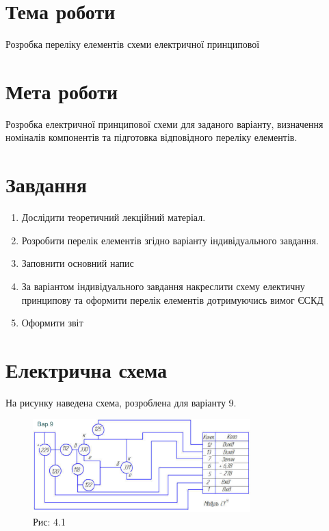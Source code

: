 \documentclass[a4paper]{article}
\begin{document}
\section*{Тема роботи}
Розробка
переліку елементів схеми електричної принципової

\section*{Мета роботи}
Розробка електричної принципової схеми для заданого варіанту, визначення номіналів компонентів та підготовка відповідного переліку елементів.

\section*{Завдання}

\begin{enumerate}
    \item Дослідити теоретичний лекційний матеріал.
    \item Розробити перелік елементів згідно варіанту індивідуального завдання.
    \item Заповнити основний напис
    \item За варіантом індивідуального завдання накреслити схему електичну принципову та оформити перелік елементів дотримуючись вимог ЄСКД
    \item Оформити звіт
\end{enumerate}

\section*{Електрична схема}
На рисунку наведена схема, розроблена для варіанту 9.

\begin{figure}[h]
    \centering
    \includegraphics[width=0.75\textwidth]{imgs/PW4.1.png}
    \caption*{Рис: 4.1}
\end{figure}
\end{document}
